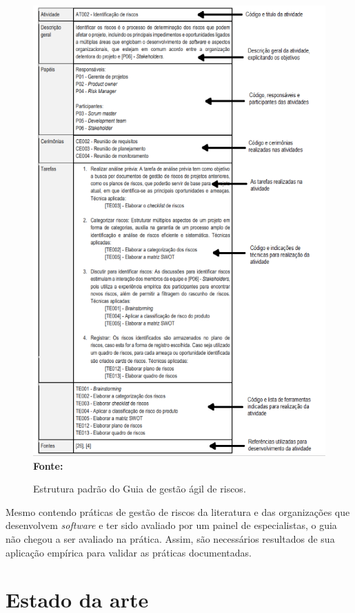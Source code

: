 \documentclass[
    12pt,       %
    openright,      %
    twoside,      %
    a4paper,      %
    english,      %
    french,       %
    spanish,      %
    brazil,       %
    ]{abntex2}
\begin{document}
\begin{figure}
    \centering
    \caption{Estrutura padrão do Guia de gestão ágil de riscos.}
    \includegraphics[width=\textwidth,height=\textheight,keepaspectratio]{src/tex/img/estrutura-guia.png}
    \textbf{Fonte:} 
    \label{fig:my_label}
\end{figure}

Mesmo contendo práticas de gestão de riscos da literatura e das organizações que desenvolvem \textit{software} e ter sido avaliado por um painel de especialistas, o guia não chegou a ser avaliado na prática. Assim, são necessários resultados de sua aplicação empírica para validar as práticas documentadas.

\chapter{Estado da arte}
\label{sec:EstadoArte}
\end{document}
